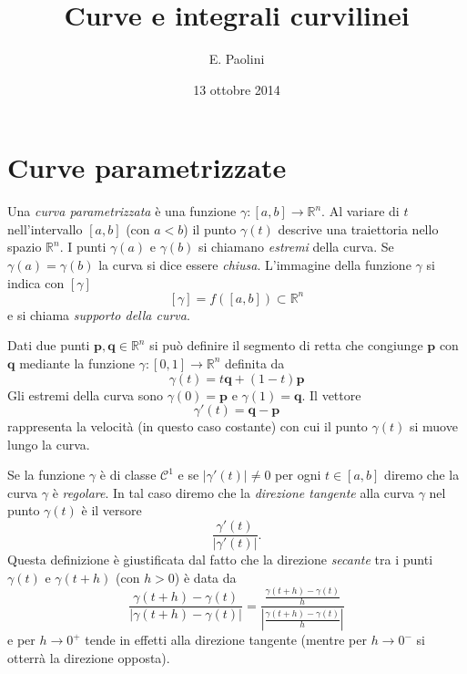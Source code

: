 \documentclass[italian,a4paper]{scrartcl}
\title{Curve e integrali curvilinei}
\author{E. Paolini}
\date{13 ottobre 2014}
\newcommand{\RR}{{\mathbb R}}
\newcommand{\C}{{\mathcal C}}
\newcommand{\defeq}{=}
\begin{document}
\maketitle

\section{Curve parametrizzate}

Una \emph{curva parametrizzata} 
è una funzione $\gamma\colon [a,b]\to
\RR^n$. Al variare di $t$ nell'intervallo $[a,b]$ (con $a<b$) il punto
$\gamma(t)$ descrive una traiettoria nello spazio $\RR^n$. I punti
$\gamma(a)$ e $\gamma(b)$ si chiamano \emph{estremi} della
curva. Se $\gamma(a)=\gamma(b)$ la curva si dice essere \emph{chiusa}. 
L'immagine della funzione $\gamma$ si indica con $[\gamma]$
\[
  [\gamma] \defeq f([a,b]) \subset \RR^n
\]
e si chiama \emph{supporto della curva}.

\begin{example}[il segmento]
Dati due punti $\mathbf p, \mathbf q\in \RR^n$ si può definire il
segmento di retta che congiunge $\mathbf p$ con $\mathbf q$ mediante la funzione
$\gamma\colon [0,1] \to \RR^n$ definita da
\[
  \gamma(t) = t \mathbf q + (1-t)\mathbf p 
\]
Gli estremi della curva sono $\gamma(0) = \mathbf p$ e $\gamma(1)=
\mathbf q$. Il vettore 
\[
  \gamma'(t) = \mathbf q- \mathbf p
\]
rappresenta la velocità (in questo caso costante) con cui il punto
$\gamma(t)$ si muove lungo la curva.
\end{example}

Se la funzione $\gamma$ è di classe $\C^1$ e se $\lvert
\gamma'(t)\rvert \neq 0$ per ogni $t \in [a,b]$ diremo che la curva $\gamma$ è
\emph{regolare}. In tal caso diremo che la \emph{direzione tangente} 
alla
curva $\gamma$ nel punto $\gamma(t)$ è il versore
\[
    \frac{\gamma'(t)}{\lvert \gamma'(t)\rvert}.
\]
Questa definizione è giustificata dal fatto che la direzione
\emph{secante} tra i punti $\gamma(t)$ e $\gamma(t+h)$ (con $h>0$)
è data da
\[
     \frac{\gamma(t+h)-\gamma(t)}{\lvert \gamma(t+h) -
       \gamma(t)\rvert}
     =
     \frac{\frac{\gamma(t+h)-\gamma(t)}{h}}{\left|\frac{\gamma(t+h)-\gamma(t)}{h}\right|}
\]
e per $h\to 0^+$ tende in effetti alla direzione tangente (mentre per $h\to 0^-$ si otterrà la direzione opposta).
\end{document}
